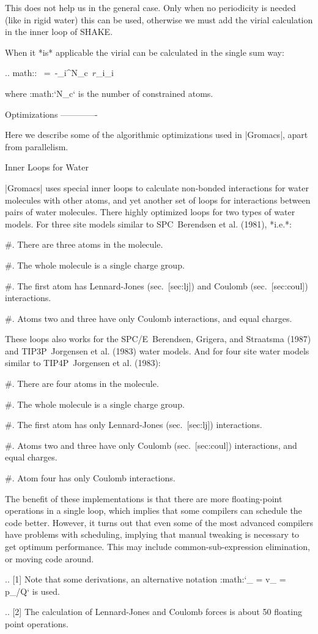 This does not help us in the general case. Only when no periodicity is
needed (like in rigid water) this can be used, otherwise we must add the
virial calculation in the inner loop of SHAKE.

When it *is* applicable the virial can be calculated in the single sum
way:

.. math:: \Xi~=~-\sum_i^{N_c}~{\mbox{\boldmath ${r}$}}_i_i

where :math:`N_c` is the number of constrained atoms.

Optimizations
-------------

Here we describe some of the algorithmic optimizations used in |Gromacs|,
apart from parallelism.

Inner Loops for Water
~~~~~~~~~~~~~~~~~~~~~

|Gromacs| uses special inner loops to calculate non-bonded interactions
for water molecules with other atoms, and yet another set of loops for
interactions between pairs of water molecules. There highly optimized
loops for two types of water models. For three site models similar to
SPC Berendsen et al. (1981), *i.e.*:

#. There are three atoms in the molecule.

#. The whole molecule is a single charge group.

#. The first atom has Lennard-Jones (sec. [sec:lj]) and Coulomb
   (sec. [sec:coul]) interactions.

#. Atoms two and three have only Coulomb interactions, and equal
   charges.

These loops also works for the SPC/E Berendsen, Grigera, and Straatsma
(1987) and TIP3P Jorgensen et al. (1983) water models. And for four site
water models similar to TIP4P Jorgensen et al. (1983):

#. There are four atoms in the molecule.

#. The whole molecule is a single charge group.

#. The first atom has only Lennard-Jones (sec. [sec:lj]) interactions.

#. Atoms two and three have only Coulomb (sec. [sec:coul]) interactions,
   and equal charges.

#. Atom four has only Coulomb interactions.

The benefit of these implementations is that there are more
floating-point operations in a single loop, which implies that some
compilers can schedule the code better. However, it turns out that even
some of the most advanced compilers have problems with scheduling,
implying that manual tweaking is necessary to get optimum performance.
This may include common-sub-expression elimination, or moving code
around.

.. [1]
   Note that some derivations, an alternative notation
   :math:`\xi_{} = v_{\xi} = p_{\xi}/Q` is used.

.. [2]
   The calculation of Lennard-Jones and Coulomb forces is about 50
   floating point operations.
